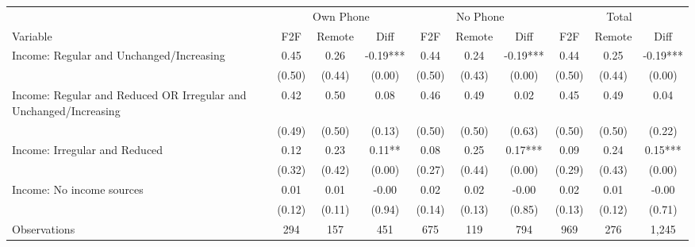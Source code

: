\begin{tabular}{l*{9}c}
\hline\hline
 & \multicolumn{3}{c}{Own Phone} & \multicolumn{3}{c}{No Phone} & \multicolumn{3}{c}{Total}\\ 
Variable & F2F & Remote & Diff & F2F & Remote & Diff & F2F & Remote & Diff \\
\hline
Income: Regular and Unchanged/Increasing&0.45&0.26&-0.19***&0.44&0.24&-0.19***&0.44&0.25&-0.19***\\
&(0.50)&(0.44)&(0.00)&(0.50)&(0.43)&(0.00)&(0.50)&(0.44)&(0.00)\\
Income: Regular and Reduced OR Irregular and Unchanged/Increasing&0.42&0.50&0.08&0.46&0.49&0.02&0.45&0.49&0.04\\
&(0.49)&(0.50)&(0.13)&(0.50)&(0.50)&(0.63)&(0.50)&(0.50)&(0.22)\\
Income: Irregular and Reduced&0.12&0.23&0.11**&0.08&0.25&0.17***&0.09&0.24&0.15***\\
&(0.32)&(0.42)&(0.00)&(0.27)&(0.44)&(0.00)&(0.29)&(0.43)&(0.00)\\
Income: No income sources&0.01&0.01&-0.00&0.02&0.02&-0.00&0.02&0.01&-0.00\\
&(0.12)&(0.11)&(0.94)&(0.14)&(0.13)&(0.85)&(0.13)&(0.12)&(0.71)\\
\hline
Observations & 294 & 157 & 451 & 675 & 119 & 794 & 969 & 276 & 1,245 \\
\hline\hline
\end{tabular}
